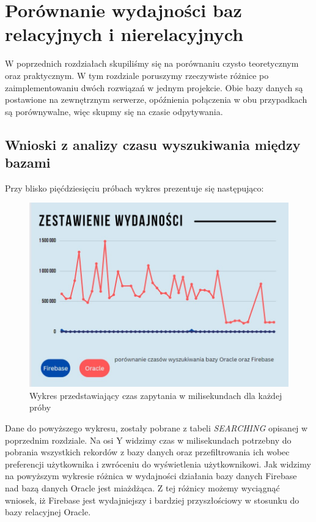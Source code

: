 \chapter{Porównanie wydajności baz relacyjnych i nierelacyjnych}

W poprzednich rozdziałach skupiliśmy się na porównaniu czysto teoretycznym oraz praktycznym. W tym rozdziale poruszymy rzeczywiste różnice po zaimplementowaniu dwóch rozwiązań w jednym projekcie. Obie bazy danych są postawione na zewnętrznym serwerze, opóźnienia połączenia w obu przypadkach są porównywalne, więc skupmy się na czasie odpytywania.

\section{Wnioski z analizy czasu wyszukiwania między bazami}
Przy blisko pięćdziesięciu próbach wykres prezentuje się następująco:
\begin{figure}[h]
    \centering
    \includegraphics[width=1\linewidth]{./img/wykres.jpg}
    \caption{Wykres przedstawiający czas zapytania w milisekundach dla każdej próby}
    \label{fig:Wykres}
\end{figure}

Dane do powyższego wykresu, zostały pobrane z tabeli \textit{SEARCHING} opisanej w poprzednim rozdziale. Na osi Y widzimy czas w milisekundach potrzebny do pobrania wszystkich rekordów z bazy danych oraz przefiltrowania ich wobec preferencji użytkownika i zwróceniu do wyświetlenia użytkownikowi. Jak widzimy na powyższym wykresie różnica w wydajności działania bazy danych Firebase nad bazą danych Oracle jest miażdżąca. Z tej różnicy możemy wyciągnąć wniosek, iż Firebase jest wydajniejszy i bardziej przyszłościowy w stosunku do bazy relacyjnej Oracle.

